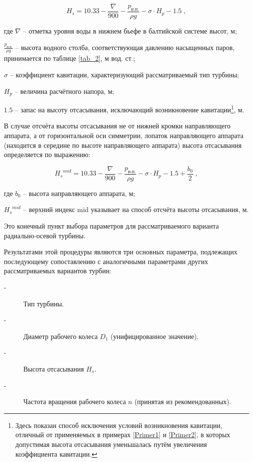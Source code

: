 $$
   H_s = 10.33 - \frac{\nabla}{900} - \frac{p_{\text{н.п.}}}{\rho g} - \sigma \cdot H_p - 1.5  \; ,
$$

где $\nabla$ -- отметка уровня воды в нижнем бьефе в балтийской системе высот, м;

$\frac{p_{\text{н.п.}}}{\rho g}$ -- высота водного столба, соответствующая давлению насыщенных паров, принимается по таблице \ref{tab_2}, м вод. ст.;

$\sigma$ -- коэффициент кавитации, характеризующий рассматриваемый тип турбины;

$H_p$ -- величина расчётного напора, м;

$1.5$ -- запас на высоту отсасывания, исключающий возникновение кавитации\footnote{Здесь показан способ исключения условий возникновения кавитации, отличный от применяемых в примерах \ref{Primer1} и \ref{Primer2}, в которых допустимая высота отсасывания уменьшалась путём увеличения коэффициента кавитации.}, м.

\vspace{0.5cm}

В случае отсчёта высоты отсасывания не от нижней кромки направляющего аппарата, а от горизонтальной оси симметрии, лопаток направляющего аппарата (находится в середине по высоте направляющего аппарата) высота отсасывания определяется по выражению:

$$
    {H_s}^{mid} = 10.33 - \frac{\nabla}{900} - \frac{p_{\text{н.п.}}}{\rho g} - \sigma \cdot H_p - 1.5 + \frac{b_0}{2}  \; ,
$$

где $b_0$ -- высота направляющего аппарата, м;

${H_s}^{mid}$ -- верхний индекс mid указывает на способ отсчёта высоты отсасывания, м.


\vspace{0.5cm}

Это конечный пункт выбора параметров для рассматриваемого варианта радиально-осевой турбины.

Результатами этой процедуры являются три основных параметра, подлежащих последующему сопоставлению с аналогичными параметрами других рассматриваемых вариантов турбин:

\begin{description}
\item[-] Тип турбины. 
\item[-] Диаметр рабочего колеса $D_1$ (унифицированное значение).
\item[-] Высота отсасывания $H_s$.
\item[-] Частота вращения рабочего колеса $n$ (принятая из рекомендованных).
\end{description}





